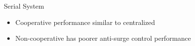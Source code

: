 \begin{frame}[plain]{Serial System}
{\begin{minipage}{0.48\linewidth}
    \end{minipage}
    \begin{minipage}{0.48\linewidth}
      
    \end{minipage}
  }
  \begin{minipage}{0.48\linewidth}
    \begin{itemize}
      \item Cooperative performance similar to centralized
      \item \alert{Non-cooperative has poorer anti-surge control performance}
    \end{itemize}
  \end{minipage}

\end{frame}

